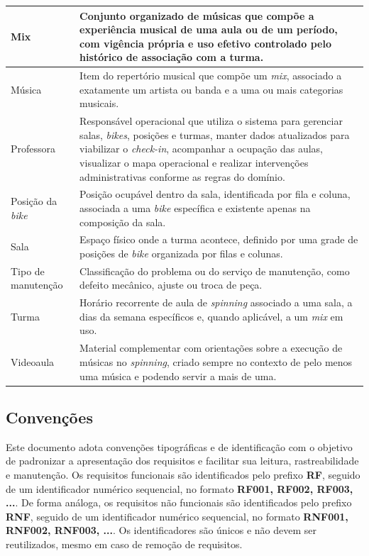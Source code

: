 \begin{longtable}{|p{4cm}|p{11cm}|}
Mix & Conjunto organizado de músicas que compõe a experiência musical de uma aula ou de um período, com vigência própria e uso efetivo controlado pelo histórico de associação com a turma. \\ \hline
Música & Item do repertório musical que compõe um \textit{mix}, associado a exatamente um artista ou banda e a uma ou mais categorias musicais. \\ \hline
Professora & Responsável operacional que utiliza o sistema para gerenciar salas, \textit{bikes}, posições e turmas, manter dados atualizados para viabilizar o \textit{check-in}, acompanhar a ocupação das aulas, visualizar o mapa operacional e realizar intervenções administrativas conforme as regras do domínio. \\ \hline
Posição da \textit{bike} & Posição ocupável dentro da sala, identificada por fila e coluna, associada a uma \textit{bike} específica e existente apenas na composição da sala. \\ \hline
Sala & Espaço físico onde a turma acontece, definido por uma grade de posições de \textit{bike} organizada por filas e colunas. \\ \hline
Tipo de manutenção & Classificação do problema ou do serviço de manutenção, como defeito mecânico, ajuste ou troca de peça. \\ \hline
Turma & Horário recorrente de aula de \textit{spinning} associado a uma sala, a dias da semana específicos e, quando aplicável, a um \textit{mix} em uso. \\ \hline
Videoaula & Material complementar com orientações sobre a execução de músicas no \textit{spinning}, criado sempre no contexto de pelo menos uma música e podendo servir a mais de uma. \\ \hline

\end{longtable}

\subsection{Convenções}

Este documento adota convenções tipográficas e de identificação com o objetivo de padronizar a apresentação dos requisitos e facilitar sua leitura, rastreabilidade e manutenção. Os requisitos funcionais são identificados pelo prefixo \textbf{RF}, seguido de um identificador numérico sequencial, no formato \textbf{RF001, RF002, RF003, ...}. De forma análoga, os requisitos não funcionais são identificados pelo prefixo \textbf{RNF}, seguido de um identificador numérico sequencial, no formato \textbf{RNF001, RNF002, RNF003, ...}. Os identificadores são únicos e não devem ser reutilizados, mesmo em caso de remoção de requisitos.

